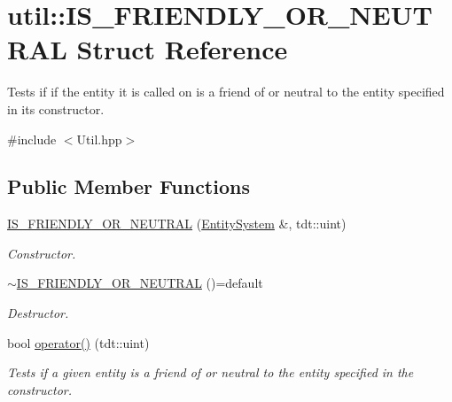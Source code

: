 \hypertarget{structutil_1_1_i_s___f_r_i_e_n_d_l_y___o_r___n_e_u_t_r_a_l}{}\section{util\+:\+:I\+S\+\_\+\+F\+R\+I\+E\+N\+D\+L\+Y\+\_\+\+O\+R\+\_\+\+N\+E\+U\+T\+R\+AL Struct Reference}
\label{structutil_1_1_i_s___f_r_i_e_n_d_l_y___o_r___n_e_u_t_r_a_l}


Tests if if the entity it is called on is a friend of or neutral to the entity specified in it\textquotesingle{}s constructor.  




{\ttfamily \#include $<$Util.\+hpp$>$}

\subsection*{Public Member Functions}
\begin{DoxyCompactItemize}
\item 
\hyperlink{structutil_1_1_i_s___f_r_i_e_n_d_l_y___o_r___n_e_u_t_r_a_l_affe7ca30c82c2de364f3a342a8961271}{I\+S\+\_\+\+F\+R\+I\+E\+N\+D\+L\+Y\+\_\+\+O\+R\+\_\+\+N\+E\+U\+T\+R\+AL} (\hyperlink{class_entity_system}{Entity\+System} \&, tdt\+::uint)
\begin{DoxyCompactList}\small\item\em Constructor. \end{DoxyCompactList}\item 
\hyperlink{structutil_1_1_i_s___f_r_i_e_n_d_l_y___o_r___n_e_u_t_r_a_l_ac3cc4a431d4f9aca74a31f4258199e99}{$\sim$\+I\+S\+\_\+\+F\+R\+I\+E\+N\+D\+L\+Y\+\_\+\+O\+R\+\_\+\+N\+E\+U\+T\+R\+AL} ()=default
\begin{DoxyCompactList}\small\item\em Destructor. \end{DoxyCompactList}\item 
bool \hyperlink{structutil_1_1_i_s___f_r_i_e_n_d_l_y___o_r___n_e_u_t_r_a_l_a1084e34dd487777fbaec169c9fbdb9b1}{operator()} (tdt\+::uint)
\begin{DoxyCompactList}\small\item\em Tests if a given entity is a friend of or neutral to the entity specified in the constructor. \end{DoxyCompactList}\end{DoxyCompactItemize}
